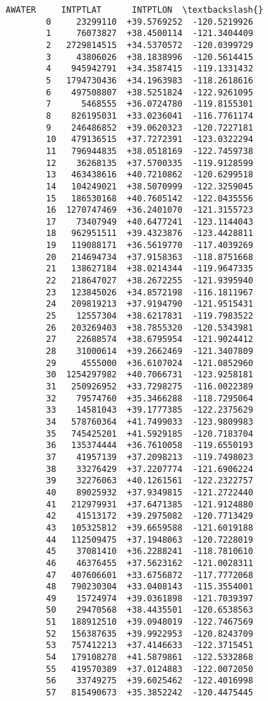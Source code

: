 \documentclass[11pt]{article}
\begin{document}
\begin{Verbatim}[commandchars=\\\{\}]
                AWATER     INTPTLAT      INTPTLON  \textbackslash{}
        0     23299110  +39.5769252  -120.5219926   
        1     76073827  +38.4500114  -121.3404409   
        2   2729814515  +34.5370572  -120.0399729   
        3     43806026  +38.1838996  -120.5614415   
        4    945942791  +34.3587415  -119.1331432   
        5   1794730436  +34.1963983  -118.2618616   
        6    497508807  +38.5251824  -122.9261095   
        7      5468555  +36.0724780  -119.8155301   
        8    826195031  +33.0236041  -116.7761174   
        9    246486852  +39.0620323  -120.7227181   
        10   479136515  +37.7272391  -123.0322294   
        11   796944835  +38.0518169  -122.7459738   
        12    36268135  +37.5700335  -119.9128599   
        13   463438616  +40.7210862  -120.6299518   
        14   104249021  +38.5070999  -122.3259045   
        15   186530168  +40.7605142  -122.0435556   
        16  1270747469  +36.2401070  -121.3155723   
        17    73407949  +40.6477241  -123.1144043   
        18   962951511  +39.4323876  -123.4428811   
        19   119088171  +36.5619770  -117.4039269   
        20   214694734  +37.9158363  -118.8751668   
        21   138627184  +38.0214344  -119.9647335   
        22   218647027  +38.2672255  -121.9395940   
        23   123845026  +34.8572198  -116.1811967   
        24   209819213  +37.9194790  -121.9515431   
        25    12557304  +38.6217831  -119.7983522   
        26   203269403  +38.7855320  -120.5343981   
        27    22688574  +38.6795954  -121.9024412   
        28    31000614  +39.2662469  -121.3407809   
        29     4555000  +36.6107024  -121.0852960   
        30  1254297982  +40.7066731  -123.9258181   
        31   250926952  +33.7298275  -116.0022389   
        32    79574760  +35.3466288  -118.7295064   
        33    14581043  +39.1777385  -122.2375629   
        34   578760364  +41.7499033  -123.9809983   
        35   745425201  +41.5929185  -120.7183704   
        36   135374444  +36.7610058  -119.6550193   
        37    41957139  +37.2098213  -119.7498023   
        38    33276429  +37.2207774  -121.6906224   
        39    32276063  +40.1261561  -122.2322757   
        40    89025932  +37.9349815  -121.2722440   
        41   212979931  +37.6471385  -121.9124880   
        42    41513172  +39.2975082  -120.7713429   
        43   105325812  +39.6659588  -121.6019188   
        44   112509475  +37.1948063  -120.7228019   
        45    37081410  +36.2288241  -118.7810610   
        46    46376455  +37.5623162  -121.0028311   
        47   407606601  +33.6756872  -117.7772068   
        48   790230304  +33.0408143  -115.3554001   
        49    15724974  +39.0361898  -121.7039397   
        50    29470568  +38.4435501  -120.6538563   
        51   188912510  +39.0948019  -122.7467569   
        52   156387635  +39.9922953  -120.8243709   
        53   757412213  +37.4146633  -122.3715451   
        54   179108278  +41.5879861  -122.5332868   
        55   419570389  +37.0124883  -122.0072050   
        56    33749275  +39.6025462  -122.4016998   
        57   815490673  +35.3852242  -120.4475445   
        

\end{Verbatim}
\end{document}
